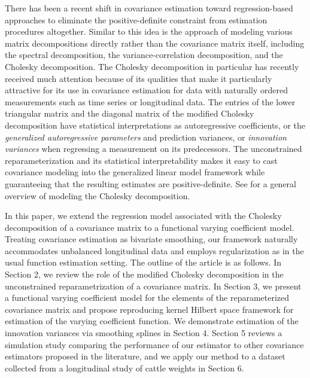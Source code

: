 \documentclass[12pt]{article}
\begin{document}
There has been a recent shift in covariance estimation toward regression-based approaches to eliminate the positive-definite constraint from estimation procedures altogether.  Similar to this idea is the approach of modeling various matrix decompositions directly rather than the covariance matrix itself, including the spectral decomposition, the variance-correlation decomposition, and the Cholesky decomposition. The Cholesky decomposition in particular has recently received much attention because of its qualities that make it particularly attractive for its use in covariance estimation for data with naturally ordered measurements such as time series or longitudinal data. The entries of the lower triangular matrix and the diagonal matrix of the modified Cholesky decomposition have statistical interpretations as autoregressive coefficients, or the \textit{generalized autoregressive parameters} and prediction variances, or \textit{innovation variances}  when regressing a measurement on its predecessors. The unconstrained reparameterization and its statistical interpretability makes it easy to cast covariance modeling into the generalized linear model framework while guaranteeing that the resulting estimates are positive-definite. See  for a general overview of modeling the Cholesky decomposition.

In this paper, we extend the regression model associated with the Cholesky decomposition of a covariance matrix to a functional varying coefficient model. Treating covariance estimation as bivariate smoothing, our framework naturally accommodates unbalanced longitudinal data and employs regularization as in the usual function estimation setting. The outline of the article is as follows. In Section 2, we review the role of the modified Cholesky decomposition in the
unconstrained reparametrization of a covariance matrix. In Section 3, we present a functional varying coefficient model for the elements of the reparameterized covariance matrix and propose reproducing kernel Hilbert space framework for estimation of the varying coefficient function. We demonstrate estimation of the innovation variances via smoothing splines in Section 4. Section 5 reviews a simulation study comparing the performance of our estimator to other covariance estimators proposed in the literature, and we apply our method to a dataset collected from a longitudinal study of cattle weights in Section 6.  
\end{document}
